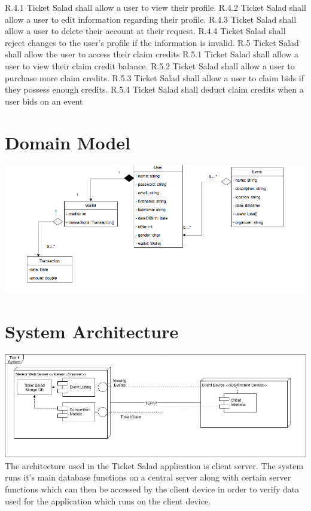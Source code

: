 \documentclass[11pt]{article}
\begin{document}
	\newline R.4.1 Ticket Salad shall allow a user to view their profile.
	\newline R.4.2 Ticket Salad shall allow a user to edit information regarding their profile.
	\newline R.4.3 Ticket Salad shall allow a user to delete their account at their request.
	\newline R.4.4 Ticket Salad shall reject changes to the user’s profile if the information is invalid.\newline\newline
	R.5 Ticket Salad shall allow the user to access their claim credits
	\newline R.5.1 Ticket Salad shall allow a user to view their claim credit balance.
	\newline R.5.2 Ticket Salad shall allow a user to purchase more claim credits.
	\newline R.5.3 Ticket Salad shall allow a user to claim bids if they possess enough credits.
	\newline R.5.4 Ticket Salad shall deduct claim credits when a user bids on an event
	\newline
	\section{Domain Model}
	\includegraphics[scale=0.4]{Domain}
	\section{System Architecture}
	\includegraphics[scale=0.4]{Architecture}
	\newline
	The architecture used in the Ticket Salad application is client server. The system runs it's main database functions on a central server along with certain server functions which can then be accessed by the client device in order to verify data used for the application which runs on the client device.
\end{document}
